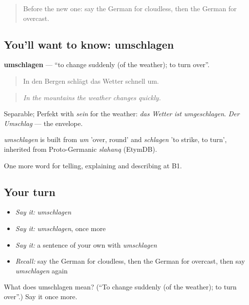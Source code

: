 \label{lesson:GE-C460-umschlagen}



\begin{quote}
Before the new one: say the German for cloudless, then the German for overcast.
\end{quote}

\subsection*{You'll want to know: umschlagen}
\textbf{umschlagen} — \textquotedblleft{}to change suddenly (of the weather); to turn over\textquotedblright{}.

\begin{quote}
In den Bergen schlägt das Wetter schnell um.
\end{quote}

\begin{quote}
\emph{In the mountains the weather changes quickly.}
\end{quote}

Separable; Perfekt with \emph{sein} for the weather: \emph{das Wetter ist umgeschlagen}. \emph{Der Umschlag} — the envelope.

\begin{cousinweb}
\emph{umschlagen} is built from \emph{um} 'over, round' and \emph{schlagen} 'to strike, to turn', inherited from Proto-Germanic \emph{slahaną} (EtymDB).
\end{cousinweb}

\begin{grammarlens}[title={What you've built}]
One more word for telling, explaining and describing at B1.
\end{grammarlens}

\subsection*{Your turn}
\begin{itemize}
\raggedright
  \item \emph{Say it:} \emph{umschlagen}
  \item \emph{Say it:} \emph{umschlagen}, once more
  \item \emph{Say it:} a sentence of your own with \emph{umschlagen}
  \item \emph{Recall:} say the German for cloudless, then the German for overcast, then say \emph{umschlagen} again
\end{itemize}

\begin{tcolorbox}[breakable,colback=teal!4,colframe=teal!35!black,title={Before you move on}]
What does umschlagen mean? (\textquotedblleft{}To change suddenly (of the weather); to turn over\textquotedblright{}.) Say it once more.
\end{tcolorbox}
